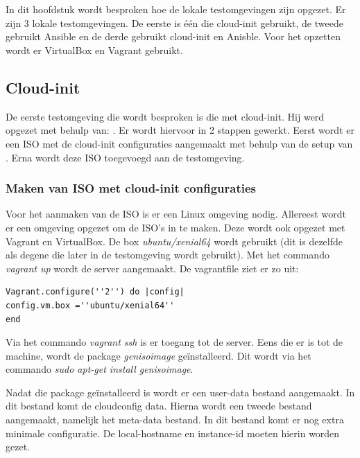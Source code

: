 \chapter{}
\label{ch:testlokaal}

In dit hoofdstuk wordt besproken hoe de lokale testomgevingen zijn opgezet. Er zijn 3 lokale testomgevingen. De eerste is één die cloud-init gebruikt, de tweede gebruikt Ansible en de derde gebruikt cloud-init en Anisble. Voor het opzetten wordt er VirtualBox en Vagrant gebruikt.

\section{Cloud-init}
De eerste testomgeving die wordt besproken is die met cloud-init. Hij werd opgezet met behulp van: \autocite{cloudVagrant}. Er wordt hiervoor in 2 stappen gewerkt. Eerst wordt er een ISO met de cloud-init configuraties aangemaakt met behulp van de setup van \autocite{cloudVagrant}. Erna wordt deze ISO toegevoegd aan de testomgeving.

\subsection{Maken van ISO met cloud-init configuraties}
Voor het aanmaken van de ISO is er een Linux omgeving nodig. Allereest wordt er een omgeving opgezet om de ISO's in te maken. Deze wordt ook opgezet met Vagrant en VirtualBox. De box \textit{ubuntu/xenial64} wordt gebruikt (dit is dezelfde als degene die later in de testomgeving wordt gebruikt). Met het commando \textit{vagrant up} wordt de server aangemaakt. De vagrantfile ziet er zo uit:
\begin{lstlisting}
Vagrant.configure(''2'') do |config|
config.vm.box =''ubuntu/xenial64''
end
\end{lstlisting}

Via het commando \textit{vagrant ssh} is er toegang tot de server. Eens die er is tot de machine, wordt de package \textit{genisoimage} geïnstalleerd. Dit wordt via het commando \textit{sudo apt-get install genisoimage}. 

Nadat die package geïnstalleerd is wordt er een user-data bestand aangemaakt. In dit bestand komt de cloudconfig data. Hierna wordt een tweede bestand aangemaakt, namelijk het meta-data bestand. In dit bestand komt er nog extra minimale configuratie. De local-hostname en instance-id moeten hierin worden gezet.

